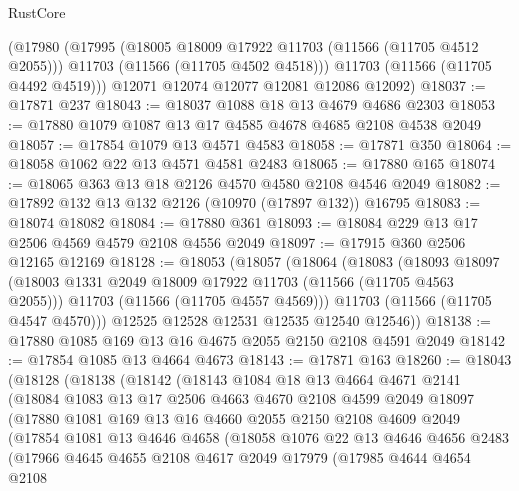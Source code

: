 \begin{lexlean}{RustCore}
\begin{coremodule}
      (@17980
        (@17995
          (@18005 @18009 @17922 @11703 (@11566 (@11705 @4512 @2055)))
          @11703
          (@11566 (@11705 @4502 @4518)))
        @11703
        (@11566 (@11705 @4492 @4519)))
      @12071
      @12074
      @12077
      @12081
      @12086
      @12092)
@18037 := @17871 @237
@18043 := @18037 @1088 @18 @13 @4679 @4686 @2303
@18053 := @17880 @1079 @1087 @13 @17 @4585 @4678 @4685 @2108 @4538 @2049
@18057 := @17854 @1079 @13 @4571 @4583
@18058 := @17871 @350
@18064 := @18058 @1062 @22 @13 @4571 @4581 @2483
@18065 := @17880 @165
@18074 := @18065 @363 @13 @18 @2126 @4570 @4580 @2108 @4546 @2049
@18082 := @17892 @132 @13 @132 @2126 (@10970 (@17897 @132)) @16795
@18083 := @18074 @18082
@18084 := @17880 @361
@18093 := @18084 @229 @13 @17 @2506 @4569 @4579 @2108 @4556 @2049
@18097 := @17915 @360 @2506 @12165 @12169
@18128 := @18053
    (@18057
      (@18064
        (@18083
          (@18093
            @18097
            (@18003 @1331 @2049 @18009 @17922 @11703 (@11566 (@11705 @4563 @2055)))
            @11703
            (@11566 (@11705 @4557 @4569)))
          @11703
          (@11566 (@11705 @4547 @4570)))
        @12525
        @12528
        @12531
        @12535
        @12540
        @12546))
@18138 := @17880 @1085 @169 @13 @16 @4675 @2055 @2150 @2108 @4591 @2049
@18142 := @17854 @1085 @13 @4664 @4673
@18143 := @17871 @163
@18260 := @18043
    (@18128
      (@18138
        (@18142
          (@18143
            @1084
            @18
            @13
            @4664
            @4671
            @2141
            (@18084
              @1083
              @13
              @17
              @2506
              @4663
              @4670
              @2108
              @4599
              @2049
              @18097
              (@17880
                @1081
                @169
                @13
                @16
                @4660
                @2055
                @2150
                @2108
                @4609
                @2049
                (@17854
                  @1081
                  @13
                  @4646
                  @4658
                  (@18058
                    @1076
                    @22
                    @13
                    @4646
                    @4656
                    @2483
                    (@17966
                      @4645
                      @4655
                      @2108
                      @4617
                      @2049
                      @17979
                      (@17985
                        @4644
                        @4654
                        @2108

\end{coremodule}
\end{lexlean}
